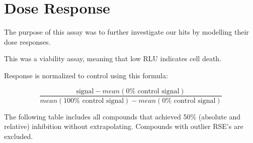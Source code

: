 \documentclass[
]{article}
\begin{document}
\newpage

\section{Dose Response}\label{dose-response}

The purpose of this assay was to further investigate our hits by
modelling their dose responses.

This was a viability assay, meaning that low RLU indicates cell death.

Response is normalized to control using this formula:

\[
\frac{\text{signal} - mean(\text{0%
\]

The following table includes all compounds that achieved 50\% (absolute
and relative) inhibition without extrapolating. Compounds with outlier
RSE's are excluded.
\end{document}
